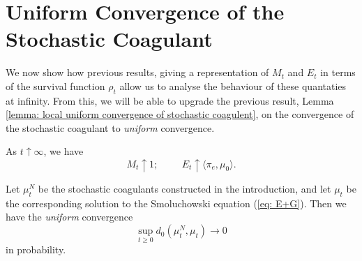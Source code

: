 \section{Uniform Convergence of the Stochastic Coagulant} We now show how previous results, giving a representation of $M_t$ and $E_t$ in terms of the survival function $\rho_t$ allow us to analyse the behaviour of these quantaties at infinity. From this, we will be able to upgrade the previous result, Lemma \ref{lemma: local uniform convergence of stochastic coagulent}, on the convergence of the stochastic coagulant to \emph{uniform} convergence. \begin{lemma}\label{lemma: M and E at infinity} As $t\uparrow \infty$, we have \begin{equation}
    M_t\uparrow 1; \hspace{1cm}E_t\uparrow \langle \pi_e, \mu_0\rangle.
\end{equation} \end{lemma}
\begin{lemma} \label{lemma: uniform convergence of coagulant} Let $\mu^N_t$ be the stochastic coagulants constructed in the introduction, and let $\mu_t$ be the corresponding solution to the Smoluchowski equation (\ref{eq: E+G}). Then we have the \emph{uniform} convergence \begin{equation} \sup_{t\ge 0} d_0(\mu^N_t, \mu_t) \rightarrow 0\end{equation} in probability.  \end{lemma} 
